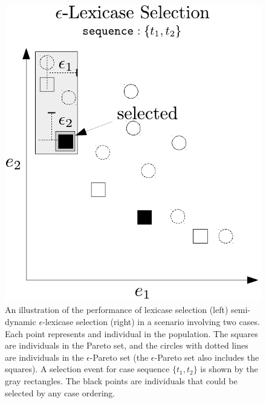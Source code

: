 \documentclass[twoside]{article}
\begin{document}
\begin{figure}[htb]
\begin{minipage}{0.49\textwidth}
  \includegraphics[width = \textwidth]{figs/ep-lex_pareto.pdf}
  
\end{minipage}
\caption{An illustration of the performance of lexicase selection (left) semi-dynamic $\epsilon$-lexicase selection (right) in a scenario involving two cases. Each point represents and individual in the population. The squares are individuals in the Pareto set, and the circles with dotted lines are individuals in the $\epsilon$-Pareto set (the $\epsilon$-Pareto set also includes the squares). A selection event for case sequence $\{t_1,t_2\}$ is shown by the gray rectangles. The black points are individuals that could be selected by any case ordering.}\label{fig:lex_pareto}
\end{figure}
\end{document}
